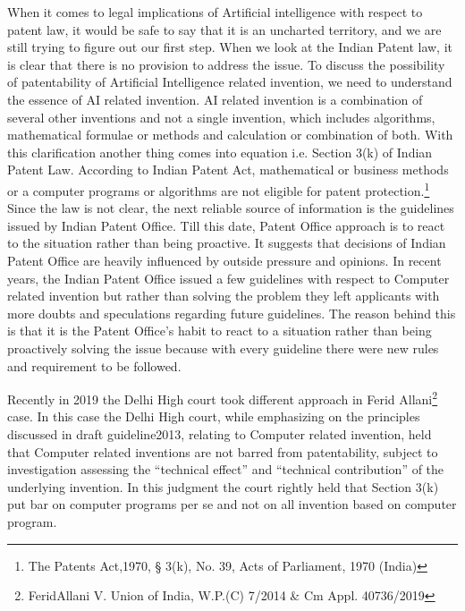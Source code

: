 \begin{multicols}{2}

\vspace{.1cm}

\noi
When it comes to legal implications of Artificial intelligence with respect to patent law, it
would be safe to say that it is an uncharted territory, and we are still trying to figure out our
first step. When we look at the Indian Patent law, it is clear that there is no provision to
address the issue. To discuss the possibility of patentability of Artificial Intelligence related
invention, we need to understand the essence of AI related invention. AI related invention is
a combination of several other inventions and not a single invention, which includes
algorithms, mathematical formulae or methods and calculation or combination of both. With
this clarification another thing comes into equation i.e. Section 3(k) of Indian Patent Law.
According to Indian Patent Act, mathematical or business methods or a computer programs
or algorithms are not eligible for patent protection.\footnote{The Patents Act,1970, § 3(k), No. 39, Acts of Parliament, 1970 (India)}
Since the law is not clear, the next
reliable source of information is the guidelines issued by Indian Patent Office. Till this date,
Patent Office approach is to react to the situation rather than being proactive. It suggests that
decisions of Indian Patent Office are heavily influenced by outside pressure and opinions. In recent years, the Indian Patent Office issued a few guidelines with respect to Computer
related invention but rather than solving the problem they left applicants with more doubts
and speculations regarding future guidelines. The reason behind this is that it is the Patent
Office’s habit to react to a situation rather than being proactively solving the issue because
with every guideline there were new rules and requirement to be followed. 

\noi
Recently in 2019 the Delhi High court took different approach in Ferid Allani\footnote{FeridAllani V. Union of India, W.P.(C) 7/2014 \& Cm Appl. 40736/2019}
 case. In this
case the Delhi High court, while emphasizing on the principles discussed in draft guideline2013, relating to Computer related invention, held that Computer related inventions are not
barred from patentability, subject to investigation assessing the “technical effect” and
“technical contribution” of the underlying invention. In this judgment the court rightly held
that Section 3(k) put bar on computer programs per se and not on all invention based on
computer program. 


\end{multicols}
